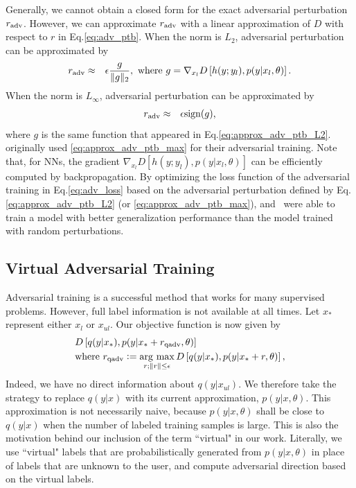 \documentclass[10pt,journal,compsoc]{IEEEtran}
\newcommand{\argmax}{\mathop{\rm arg~max}\limits}
\newcommand{\defeq}{\vcentcolon=}
\begin{document}
Generally, we cannot obtain a closed form for the exact adversarial perturbation $r_{\rm adv}$.
However, we can approximate $r_{\rm adv}$ with a linear approximation of $D$ with respect to $r$ in Eq.\eqref{eq:adv_ptb}. 
When the norm is $L_2$, adversarial perturbation can be approximated by
\begin{eqnarray}
r_{\rm adv} &\approx&  \epsilon \frac{g}{\|g\|_2},\ {\rm where}\ g=\nabla_{x_l} D\left[h(y;y_l), p(y|x_l, \theta)\right]. \label{eq:approx_adv_ptb_L2}
\end{eqnarray} 
When the norm is $L_{\infty}$, adversarial perturbation can be approximated by
\begin{eqnarray}
r_{\rm adv} &\approx&  \epsilon {\rm sign}(g), \label{eq:approx_adv_ptb_max}
\end{eqnarray}
where $g$ is the same function that appeared in Eq.\eqref{eq:approx_adv_ptb_L2}.
\cite{goodfellow2014explaining} originally used \eqref{eq:approx_adv_ptb_max} for their adversarial training.
Note that, for NNs, the gradient $\nabla_{x_l} D\left[h(y;y_l), p(y|x_l, \theta)\right]$ can be efficiently computed by backpropagation.
By optimizing the loss function of the adversarial training in Eq.\eqref{eq:adv_loss} based on the adversarial perturbation defined by Eq.\eqref{eq:approx_adv_ptb_L2} (or \eqref{eq:approx_adv_ptb_max}), \cite{goodfellow2014explaining} and~\cite{miyato2015distributional} were able to train a model with better generalization performance than the model trained with random perturbations.

\subsection{\label{subsec:vat}Virtual Adversarial Training}
Adversarial training is a successful method that works for many supervised problems.
However, full label information is not available at all times. Let $x_*$ represent either $x_l$ or $x_{ul}$.  Our objective function is now given by
\begin{align}
	&D\left[q(y|x_*),p(y|x_*+r_{\rm qadv},\theta)\right] \nonumber \\
    &{\rm where}\ r_{\rm qadv} \defeq \argmax_{r;\|r\|\leq\epsilon} D\left[q(y|x_*), p(y|x_*+r, \theta)\right] \nonumber,
\end{align} 
Indeed, we have no direct information about $q(y|x_{ul})$. We therefore take the  strategy to replace $q(y|x)$ with its current  approximation, $p(y|x, \theta)$. This approximation is not necessarily naive, because $p(y|x, \theta)$ shall be close to $q(y|x)$ when the number of labeled training samples is large.
This is also the motivation behind our inclusion of the term ``virtual" in our work.
Literally,  we use ``virtual" labels that are probabilistically generated from $p(y|x, \theta)$ in place of labels that are unknown to the user, and compute adversarial direction based on the virtual labels.
\end{document}
